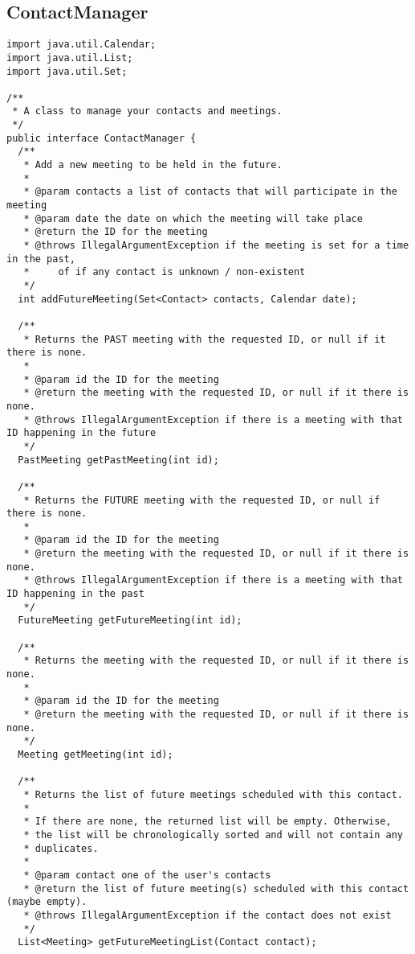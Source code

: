 \documentclass{article}
\begin{document}
\subsection{ContactManager}
\label{sec:contactmanager}


\begin{verbatim}
import java.util.Calendar;
import java.util.List;
import java.util.Set;

/**
 * A class to manage your contacts and meetings. 
 */
public interface ContactManager {
  /**
   * Add a new meeting to be held in the future.
   * 
   * @param contacts a list of contacts that will participate in the meeting
   * @param date the date on which the meeting will take place
   * @return the ID for the meeting
   * @throws IllegalArgumentException if the meeting is set for a time in the past, 
   *     of if any contact is unknown / non-existent 
   */
  int addFutureMeeting(Set<Contact> contacts, Calendar date);

  /**
   * Returns the PAST meeting with the requested ID, or null if it there is none. 
   *
   * @param id the ID for the meeting
   * @return the meeting with the requested ID, or null if it there is none. 
   * @throws IllegalArgumentException if there is a meeting with that ID happening in the future
   */
  PastMeeting getPastMeeting(int id);

  /**
   * Returns the FUTURE meeting with the requested ID, or null if there is none. 
   * 
   * @param id the ID for the meeting
   * @return the meeting with the requested ID, or null if it there is none. 
   * @throws IllegalArgumentException if there is a meeting with that ID happening in the past
   */
  FutureMeeting getFutureMeeting(int id);

  /**
   * Returns the meeting with the requested ID, or null if it there is none. 
   * 
   * @param id the ID for the meeting
   * @return the meeting with the requested ID, or null if it there is none. 
   */
  Meeting getMeeting(int id);

  /**
   * Returns the list of future meetings scheduled with this contact.
   * 
   * If there are none, the returned list will be empty. Otherwise,
   * the list will be chronologically sorted and will not contain any
   * duplicates. 
   * 
   * @param contact one of the user's contacts
   * @return the list of future meeting(s) scheduled with this contact (maybe empty).
   * @throws IllegalArgumentException if the contact does not exist
   */
  List<Meeting> getFutureMeetingList(Contact contact);


\end{verbatim}
\end{document}
